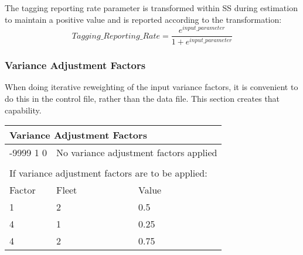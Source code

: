 The tagging reporting rate parameter is transformed within SS during estimation to maintain a positive value and is reported according to the transformation:
\begin{equation}
	Tagging\_Reporting\_Rate = \frac{e^{input\_parameter}}{1+e^{input\_parameter}}
\end{equation}

\subsubsection{Variance Adjustment Factors}
When doing iterative reweighting of the input variance factors, it is convenient to do this in the control file, rather than the data file.  This section creates that capability.
\begin{center}
	\begin{longtable}{p{3cm} p{3cm} p{7cm} }

		 \multicolumn{3}{l}{Variance Adjustment Factors }\\
		 \hline
		-9999 1 0 & \multicolumn{2}{l}{No variance adjustment factors applied }\\
		\\
		\multicolumn{3}{l}{If variance adjustment factors are to be applied:}\\
		\hline
		Factor & Fleet & Value \\
		\hline
		1 & 2 & 0.5 \\
		4 & 1 & 0.25 \\
		4 & 2 & 0.75 \\
		\hline
	\end{longtable}
\end{center}

